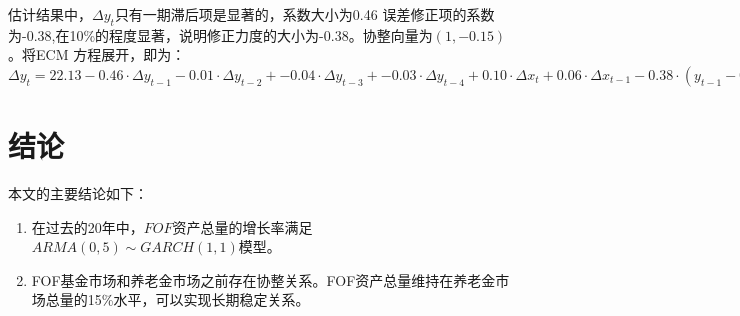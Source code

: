 \documentclass[10.5pt,onecolumn,a4paper]{article}%
\begin{document}
估计结果中，$\Delta y_t$只有一期滞后项是显著的，系数大小为0.46
误差修正项的系数为-0.38,在10\%的程度显著，说明修正力度的大小为-0.38。协整向量为$(1, -0.15)$。将ECM 方程展开，即为：
$
\Delta y_t =22.13  -0.46 \cdot \Delta y_{t-1} -0.01 \cdot \Delta  y_{t-2} +  -0.04 \cdot \Delta  y_{t-3} + -0.03 \cdot \Delta  y_{t-4} + 0.10 \cdot \Delta  x_t+ 0.06 \cdot \Delta  x_{t-1} -0.38 \cdot ( y_{t-1}-0.15x_{t-1}) + \epsilon_t$
\section{结论}
本文的主要结论如下：
    \begin{enumerate}
        \item 在过去的20年中，$FOF$资产总量的增长率满足$ARMA(0,5) \sim GARCH(1,1)$模型。
        \item FOF基金市场和养老金市场之前存在协整关系。FOF资产总量维持在养老金市场总量的15\%水平，可以实现长期稳定关系。
    \end{enumerate}
\end{document}
